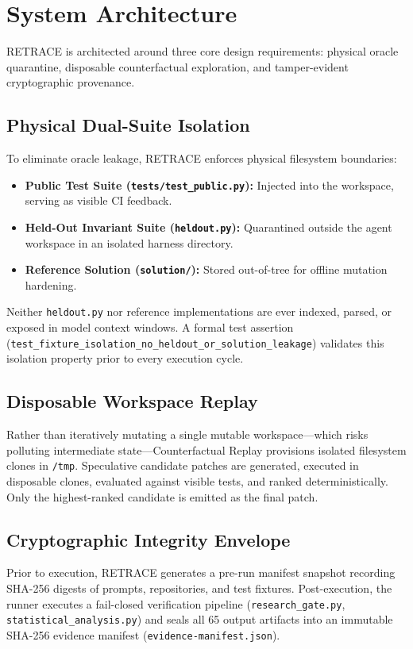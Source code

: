 \documentclass[10pt,twocolumn,letterpaper]{article}
\begin{document}
\section{System Architecture}

RETRACE is architected around three core design requirements: physical oracle quarantine, disposable counterfactual exploration, and tamper-evident cryptographic provenance.

\subsection{Physical Dual-Suite Isolation}
To eliminate oracle leakage, RETRACE enforces physical filesystem boundaries:
\begin{itemize}
    \item \textbf{Public Test Suite (\texttt{tests/test\_public.py}):} Injected into the workspace, serving as visible CI feedback.
    \item \textbf{Held-Out Invariant Suite (\texttt{heldout.py}):} Quarantined outside the agent workspace in an isolated harness directory.
    \item \textbf{Reference Solution (\texttt{solution/}):} Stored out-of-tree for offline mutation hardening.
\end{itemize}
Neither \texttt{heldout.py} nor reference implementations are ever indexed, parsed, or exposed in model context windows. A formal test assertion (\texttt{test\_fixture\_isolation\_no\_heldout\_or\_solution\_leakage}) validates this isolation property prior to every execution cycle.

\subsection{Disposable Workspace Replay}
Rather than iteratively mutating a single mutable workspace—which risks polluting intermediate state—Counterfactual Replay provisions isolated filesystem clones in \texttt{/tmp}. Speculative candidate patches are generated, executed in disposable clones, evaluated against visible tests, and ranked deterministically. Only the highest-ranked candidate is emitted as the final patch.

\subsection{Cryptographic Integrity Envelope}
Prior to execution, RETRACE generates a pre-run manifest snapshot recording SHA-256 digests of prompts, repositories, and test fixtures. Post-execution, the runner executes a fail-closed verification pipeline (\texttt{research\_gate.py}, \texttt{statistical\_analysis.py}) and seals all 65 output artifacts into an immutable SHA-256 evidence manifest (\texttt{evidence-manifest.json}).
\end{document}
